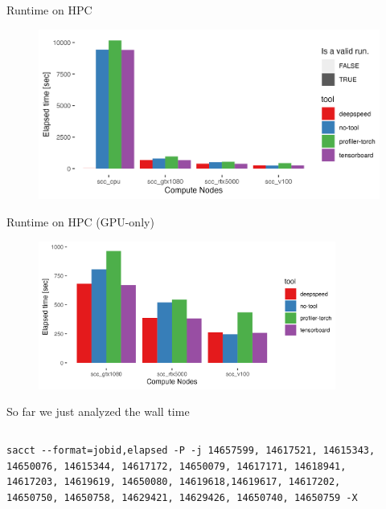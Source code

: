 \documentclass[compress,aspectratio=169]{beamer}
\begin{document}
\begin{frame}{Runtime on HPC}
    \begin{center}
    \begin{figure}
        \includegraphics[width=1\textwidth]{../../data/sacct_barplot_by_nodes_no-experiment}
    \end{figure}
    \end{center}
\end{frame}

\begin{frame}{Runtime on HPC (GPU-only)}
    \begin{center}
    \begin{figure}
        \includegraphics[width=0.87\textwidth]{../../data/sacct_barplot_by_nodes_no-experiment_gpu}
    \end{figure}
    \end{center}
\end{frame}

\begin{frame}[fragile]{So far we just analyzed the wall time}
\begin{columns}
\begin{column}{0.7\textwidth}
        \begin{verbatim}
sacct --format=jobid,elapsed -P -j 14657599, 14617521, 14615343, 14650076, 14615344, 14617172, 14650079, 14617171, 14618941, 14617203, 14619619, 14650080, 14619618,14619617, 14617202, 14650750, 14650758, 14629421, 14629426, 14650740, 14650759 -X
        \end{verbatim}
\end{column}

\begin{column}{0.3\textwidth}
    \vspace{-2em}
        \inputminted[xleftmargin=1em,linenos,fontsize=\tiny,]{python}{../../data/sacct.out}
\end{column}
\end{columns}
\end{frame}
\end{document}
